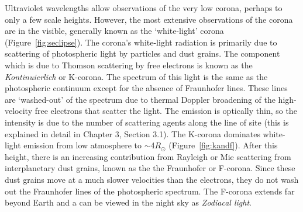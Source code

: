 Ultraviolet wavelengths allow observations of the very low corona, perhaps to only a few scale heights. However, the most extensive observations of the corona are in the visible, generally known as the `white-light' corona (Figure~\ref{fig:seclipse}). The corona's white-light radiation is primarily due to scattering of photospheric light by particles and dust grains. The component which is due to Thomson scattering by free electrons is known as the {\it Kontinuierlich} or K-corona. The spectrum of this light is the same as the photospheric continuum except for the absence of Fraunhofer lines. These lines are `washed-out' of the spectrum due to thermal Doppler broadening of the high-velocity free electrons that scatter the light. The emission is optically thin, so the intensity is due to the number of scattering agents along the line of site (this is explained in detail in Chapter 3, Section 3.1). The K-corona dominates white-light emission from low atmosphere to $\sim$4$R_{\odot}$ (Figure~\ref{fig:kandf}). After this height, there is an increasing contribution from Rayleigh or Mie scattering from interplanetary dust grains, known as the the Fraunhofer or F-corona. Since these dust grains move at a much slower velocities than the electrons, they do not wash out the Fraunhofer lines of the photospheric spectrum. The F-corona extends far beyond Earth and a can be viewed in the night sky as {\it Zodiacal light}.

